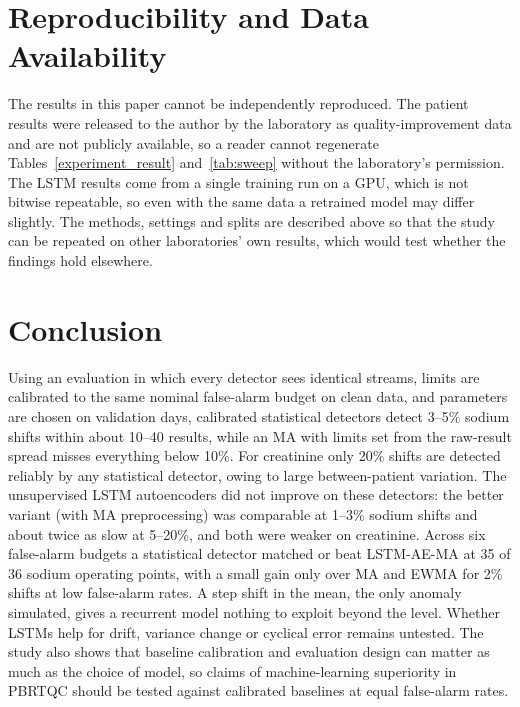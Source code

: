 \documentclass[conference]{IEEEtran}
\begin{document}
\section*{Reproducibility and Data Availability}
The results in this paper cannot be independently reproduced. The patient results were released to the author by the laboratory as quality-improvement data and are not publicly available, so a reader cannot regenerate Tables~\ref{experiment_result} and~\ref{tab:sweep} without the laboratory's permission. The LSTM results come from a single training run on a GPU, which is not bitwise repeatable, so even with the same data a retrained model may differ slightly. The methods, settings and splits are described above so that the study can be repeated on other laboratories' own results, which would test whether the findings hold elsewhere.

\section*{Conclusion}
Using an evaluation in which every detector sees identical streams, limits are calibrated to the same nominal false-alarm budget on clean data, and parameters are chosen on validation days, calibrated statistical detectors detect 3--5\% sodium shifts within about 10--40 results, while an MA with limits set from the raw-result spread misses everything below 10\%. For creatinine only 20\% shifts are detected reliably by any statistical detector, owing to large between-patient variation. The unsupervised LSTM autoencoders did not improve on these detectors: the better variant (with MA preprocessing) was comparable at 1--3\% sodium shifts and about twice as slow at 5--20\%, and both were weaker on creatinine. Across six false-alarm budgets a statistical detector matched or beat LSTM-AE-MA at 35 of 36 sodium operating points, with a small gain only over MA and EWMA for 2\% shifts at low false-alarm rates. A step shift in the mean, the only anomaly simulated, gives a recurrent model nothing to exploit beyond the level. Whether LSTMs help for drift, variance change or cyclical error remains untested. The study also shows that baseline calibration and evaluation design can matter as much as the choice of model, so claims of machine-learning superiority in PBRTQC should be tested against calibrated baselines at equal false-alarm rates.



\end{document}
